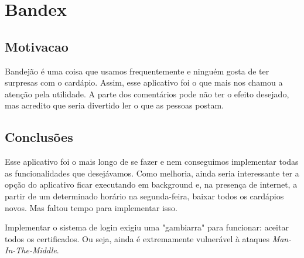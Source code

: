 \section{Bandex}

\subsection{Motivacao}
Bandejão é uma coisa que usamos frequentemente e ninguém gosta de ter surpresas com o cardápio. Assim, esse aplicativo foi o que mais nos chamou a atenção pela utilidade. A parte dos comentários pode não ter o efeito desejado, mas acredito que seria divertido ler o que as pessoas postam.

\subsection{Conclusões}
Esse aplicativo foi o mais longo de se fazer e nem conseguimos implementar todas as funcionalidades que desejávamos. Como melhoria, ainda seria interessante ter a opção do aplicativo ficar executando em background e, na presença de internet, a partir de um determinado horário na segunda-feira, baixar todos os cardápios novos. Mas faltou tempo para implementar isso.

Implementar o sistema de login exigiu uma "gambiarra" para funcionar: aceitar todos os certificados. Ou seja, ainda é extremamente vulnerável à ataques \textit{Man-In-The-Middle}.